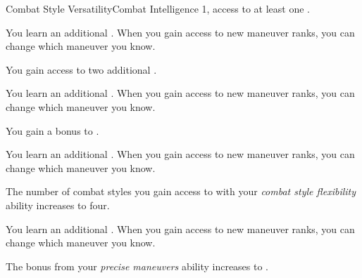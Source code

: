     \begin{feat}{Combat Style Versatility}{Combat}
        \featpre Intelligence 1, access to at least one .

         You learn an additional .
        When you gain access to new maneuver ranks, you can change which maneuver you know.

         You gain access to two additional .

         You learn an additional .
        When you gain access to new maneuver ranks, you can change which maneuver you know.

         You gain a  bonus to .

         You learn an additional .
        When you gain access to new maneuver ranks, you can change which maneuver you know.

         The number of combat styles you gain access to with your \textit{combat style flexibility} ability increases to four.

         You learn an additional .
        When you gain access to new maneuver ranks, you can change which maneuver you know.

         The bonus from your \textit{precise maneuvers} ability increases to .
    \end{feat}

